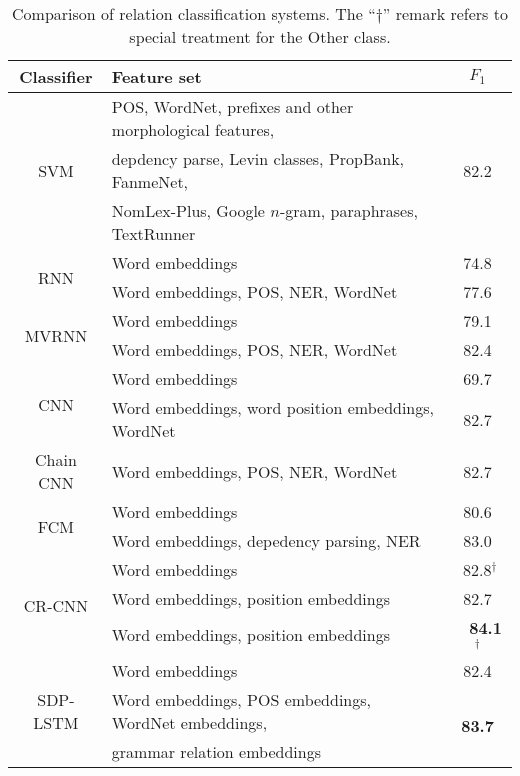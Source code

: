 \documentclass[11pt,a4paper]{article}
\begin{document}
\begin{table*}[!t]
\centering
\begin{tabular}{c|l|c}
\hline
\hline
\textbf{Classifier} &\centering \textbf{Feature set} &\textbf{$F_1$}\\
\hline
\multirow{3}{*}{SVM}                & POS, WordNet, prefixes and other morphological features, & \multirow{3}{*}{82.2}\\
                   & depdency parse, Levin classes, PropBank, FanmeNet,       &     \\
                   & NomLex-Plus, Google $n$-gram, paraphrases, TextRunner    &     \\
\hline
\multirow{2}{*}{RNN}               & Word embeddings                                          & 74.8\\
                   & Word embeddings, POS, NER, WordNet                       & 77.6\\
\hline
\multirow{2}{*}{MVRNN}              & Word embeddings                                          & 79.1\\
                   & Word embeddings, POS, NER, WordNet                       & 82.4\\
\hline
\multirow{2}{*}{CNN}                &Word embeddings                                           & 69.7\\
                   &Word embeddings, word position embeddings, WordNet        & 82.7\\
\hline
Chain CNN & Word embeddings, POS, NER, WordNet  & 82.7\\
\hline
\multirow{2}{*}{FCM}                & Word embeddings                                         & 80.6\\
                    & Word embeddings, depedency parsing, NER                   & 83.0\\
\hline
\multirow{3}{*}{CR-CNN}              & Word embeddings             & \,\,82.8$^\dag$\\
& Word embeddings, position embeddings & 82.7 \\
                   & Word embeddings, position embeddings                      &\ \ \textbf{84.1}$^\dag$\\
\hline
\multirow{3}{*}{SDP-LSTM}          & Word embeddings                                           & 82.4\\
                    & Word embeddings, POS embeddings, WordNet embeddings,      &
                    \multirow{2}{*}{\textbf{83.7}}\\
                    & grammar relation embeddings                               & \\
\hline
\hline
\end{tabular}
\caption{Comparison of relation classification systems. The ``$\dag$'' remark refers to
special treatment for the {\ttfamily Other} class.}
\end{table*}
\end{document}
